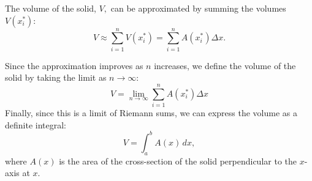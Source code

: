 \documentclass{ximera}
\begin{document}
The volume of the solid, $V,$ can be approximated by summing the volumes $V(x_i^*)$: %
\[
V \approx \sum_{i=1}^n V(x_i^*) = \sum_{i=1}^n A(x_i^*) \Delta x.
\]

Since the approximation improves as $n$ increases, we define the volume of the solid by taking the limit as $n \to \infty$:
\[
V = \lim_{n \to \infty} \sum_{i=1}^n A(x_i^*) \Delta x
\]
Finally, since this is a limit of Riemann sums, we can express the volume as a definite integral:
\[
V = \int_a^b A(x) \, dx,
\]
where $A(x)$ is the area of the cross-section of the solid perpendicular to the $x$-axis at $x$.
\end{document}
